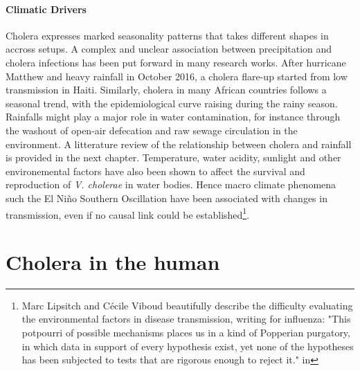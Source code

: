 \paragraph{Climatic Drivers} Cholera expresses marked seasonality patterns that takes different shapes in accross setups. A complex and unclear association between precipitation and cholera infections has been put forward in many research works. After hurricane Matthew and heavy rainfall in October 2016, a cholera flare-up started from low transmission in Haiti\cite{Pasetto:RealtimeForecastingCholera:2018}. Similarly, cholera in many African countries follows a seasonal trend, with the epidemiological curve raising during the rainy season\cite{Baracchini:SeasonalityCholeraDynamics:2017}.  Rainfalls might play a major role in water contamination, for instance through the washout of open-air defecation and raw sewage circulation in the environment. A litterature review of the relationship between cholera and rainfall is provided in the next chapter. Temperature, water acidity, sunlight and other environemental factors have also been shown to affect the survival and reproduction of \textit{V. cholerae} in water bodies. Hence macro climate phenomena such the El Niño Southern Oscillation have been associated with changes in transmission, even if no causal link could be established\cite[-2\baselineskip]{Pascual:CholeraDynamicsNinoSouthern:2000}\footnote{Marc Lipsitch and Cécile Viboud beautifully describe the difficulty evaluating the environmental factors in disease transmission, writing for influenza: "This potpourri of possible mechanisms places us in a kind of Popperian purgatory, in which data in support of every hypothesis exist, yet none of the hypotheses has been subjected to tests that are rigorous enough to reject it." in }.

\section{Cholera in the human} 
